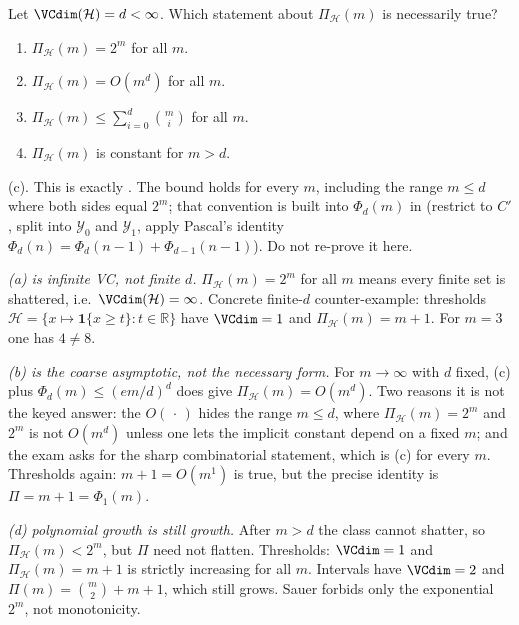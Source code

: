 \begin{exercise}
\label{ex:mlu-growth-mcq}
Let $\VCdim(\mathcal{H})=d<\infty$. Which statement about $\Pi_{\mathcal{H}}(m)$ is necessarily true?
\begin{enumerate}[label=(\alph*)]
    \item $\Pi_{\mathcal{H}}(m)=2^m$ for all $m$.
    \item $\Pi_{\mathcal{H}}(m)=O(m^d)$ for all $m$.
    \item $\Pi_{\mathcal{H}}(m)\le\sum_{i=0}^d\binom{m}{i}$ for all $m$.
    \item $\Pi_{\mathcal{H}}(m)$ is constant for $m>d$.
\end{enumerate}
\end{exercise}

\begin{solution}
(c). This is exactly . The bound holds for every $m$, including the range $m\le d$ where both sides equal $2^m$; that convention is built into $\Phi_d(m)$ in  (restrict to $C'$, split into $\mathcal{Y}_0$ and $\mathcal{Y}_1$, apply Pascal's identity $\Phi_d(n)=\Phi_d(n-1)+\Phi_{d-1}(n-1)$). Do not re-prove it here.

\textit{(a) is infinite VC, not finite $d$.}
$\Pi_{\mathcal{H}}(m)=2^m$ for all $m$ means every finite set is shattered, i.e.\ $\VCdim(\mathcal{H})=\infty$. Concrete finite-$d$ counter-example: thresholds $\mathcal{H}=\{x\mapsto\mathbf{1}\{x\ge t\}:t\in\mathbb{R}\}$ have $\VCdim=1$ and $\Pi_{\mathcal{H}}(m)=m+1$. For $m=3$ one has $4\ne 8$.

\textit{(b) is the coarse asymptotic, not the necessary form.}
For $m\to\infty$ with $d$ fixed, (c) plus $\Phi_d(m)\le(em/d)^d$ does give $\Pi_{\mathcal{H}}(m)=O(m^d)$. Two reasons it is not the keyed answer: the $O(\,\cdot\,)$ hides the range $m\le d$, where $\Pi_{\mathcal{H}}(m)=2^m$ and $2^m$ is not $O(m^d)$ unless one lets the implicit constant depend on a fixed $m$; and the exam asks for the sharp combinatorial statement, which is (c) for every $m$. Thresholds again: $m+1=O(m^1)$ is true, but the precise identity is $\Pi=m+1=\Phi_1(m)$.

\textit{(d) polynomial growth is still growth.}
After $m>d$ the class cannot shatter, so $\Pi_{\mathcal{H}}(m)<2^m$, but $\Pi$ need not flatten. Thresholds: $\VCdim=1$ and $\Pi_{\mathcal{H}}(m)=m+1$ is strictly increasing for all $m$. Intervals have $\VCdim=2$ and $\Pi(m)=\binom{m}{2}+m+1$, which still grows. Sauer forbids only the exponential $2^m$, not monotonicity.
\end{solution}

